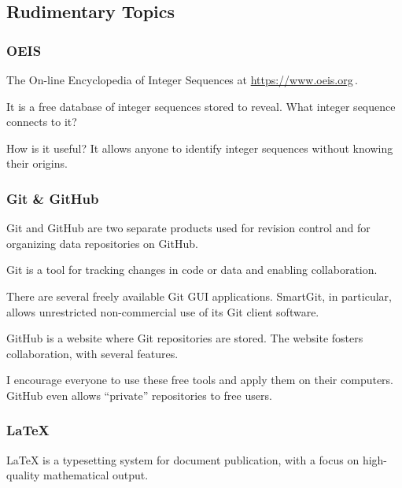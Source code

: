 \documentclass[12pt]{article}
\begin{document}
   
    \subsection{Rudimentary Topics}
    \label{sec:15}

        \subsubsection{OEIS}
        \label{secb:15}
        
        The On-line Encyclopedia of Integer Sequences at \url{https://www.oeis.org}\,.
        
        It is a free database of integer sequences stored to reveal. What integer sequence 
        connects to it?
        
        How is it useful? It allows anyone to identify integer sequences without knowing their 
        origins.
        
        \subsubsection{Git \& GitHub}
        \label{secb:16}
        
        Git and GitHub are two separate products used for revision control and for organizing 
        data repositories on GitHub.
        
        Git is a tool for tracking changes in code or data and enabling collaboration.
        
        There are several freely available Git GUI applications. SmartGit, in particular, allows 
        unrestricted non-commercial use of its Git client software.
        
        GitHub is a website where Git repositories are stored. The website fosters collaboration, 
        with several features.
        
        I encourage everyone to use these free tools and apply them on their computers. GitHub 
        even allows ``private'' repositories to free users.
        
        \subsubsection{\LaTeX{}}
        \label{secb:17}
        
        \LaTeX{} is a typesetting system for document publication, with a focus on high-quality 
        mathematical output.
        
\end{document}
